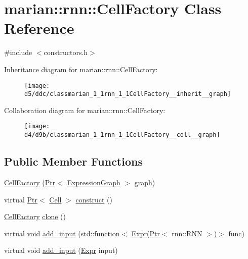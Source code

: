 \hypertarget{classmarian_1_1rnn_1_1CellFactory}{}\section{marian\+:\+:rnn\+:\+:Cell\+Factory Class Reference}
\label{classmarian_1_1rnn_1_1CellFactory}


{\ttfamily \#include $<$constructors.\+h$>$}



Inheritance diagram for marian\+:\+:rnn\+:\+:Cell\+Factory\+:
\nopagebreak
\begin{figure}[H]
\begin{center}
\leavevmode
\texttt{[image: d5/ddc/classmarian\_1\_1rnn\_1\_1CellFactory\_\_inherit\_\_graph]}
\end{center}
\end{figure}


Collaboration diagram for marian\+:\+:rnn\+:\+:Cell\+Factory\+:
\nopagebreak
\begin{figure}[H]
\begin{center}
\leavevmode
\texttt{[image: d4/d9b/classmarian\_1\_1rnn\_1\_1CellFactory\_\_coll\_\_graph]}
\end{center}
\end{figure}
\subsection*{Public Member Functions}
\begin{DoxyCompactItemize}
\item 
\hyperlink{classmarian_1_1rnn_1_1CellFactory_a8bc10b58aae39754e29d6793d29889f2}{Cell\+Factory} (\hyperlink{namespacemarian_ad1a373be43a00ef9ce35666145137b08}{Ptr}$<$ \hyperlink{classmarian_1_1ExpressionGraph}{Expression\+Graph} $>$ graph)
\item 
virtual \hyperlink{namespacemarian_ad1a373be43a00ef9ce35666145137b08}{Ptr}$<$ \hyperlink{classmarian_1_1rnn_1_1Cell}{Cell} $>$ \hyperlink{classmarian_1_1rnn_1_1CellFactory_a6d5ae6563bf3f0631b9b93b7f5eeb7b8}{construct} ()
\item 
\hyperlink{classmarian_1_1rnn_1_1CellFactory}{Cell\+Factory} \hyperlink{classmarian_1_1rnn_1_1CellFactory_a70eb689eb1d0afbe2d705914965476e5}{clone} ()
\item 
virtual void \hyperlink{classmarian_1_1rnn_1_1CellFactory_ab216b55d0ee66622c060c86b87a623b2}{add\+\_\+input} (std\+::function$<$ \hyperlink{namespacemarian_a498d8baf75b754011078b890b39c8e12}{Expr}(\hyperlink{namespacemarian_ad1a373be43a00ef9ce35666145137b08}{Ptr}$<$ rnn\+::\+R\+NN $>$)$>$ func)
\item 
virtual void \hyperlink{classmarian_1_1rnn_1_1CellFactory_a6dfd2bcc2d06e627af61295936a42d38}{add\+\_\+input} (\hyperlink{namespacemarian_a498d8baf75b754011078b890b39c8e12}{Expr} input)
\end{DoxyCompactItemize}
